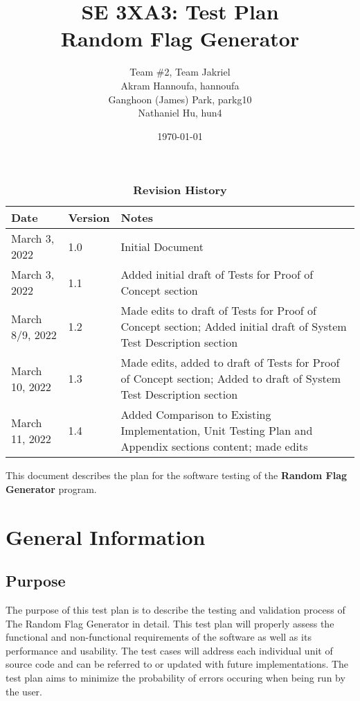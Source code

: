 \documentclass[12pt, titlepage]{article}
\title{SE 3XA3: Test Plan\\Random Flag Generator}
\author{Team \#2, Team Jakriel
		\\ Akram Hannoufa, hannoufa
		\\ Ganghoon (James) Park, parkg10
		\\ Nathaniel Hu, hun4
}
\date{\today}
\begin{document}
\maketitle

\tableofcontents
\listoftables

\newpage
\begin{table}[h]
\caption{\bf Revision History}
\begin{tabularx}{\textwidth}{p{3cm}p{2cm}X}
\toprule {\bf Date} & {\bf Version} & {\bf Notes}\\
\midrule
March 3, 2022 & 1.0 & Initial Document\\
March 3, 2022 & 1.1 & Added initial draft of Tests for Proof of Concept section\\
March 8/9, 2022 & 1.2 & Made edits to draft of Tests for Proof of Concept section; Added initial draft of System Test Description section\\
March 10, 2022 & 1.3 & Made edits, added to draft of Tests for Proof of
Concept section; Added to draft of System Test Description section\\
March 11, 2022 & 1.4 & Added Comparison to Existing Implementation, Unit Testing Plan and Appendix sections content; made edits\\
\bottomrule
\end{tabularx}
\end{table}

\newpage


\noindent This document describes the plan for the software testing of the \textbf{Random Flag Generator} program.

\section{General Information}

\subsection{Purpose}
The purpose of this test plan is to describe the testing and validation
process of The Random Flag Generator in detail. This test plan will properly
assess the functional and non-functional requirements of the software as well
as its performance and usability. The test cases will address each individual
unit of source code and can be referred to or updated with future
implementations. The test plan aims to minimize the probability of errors
occuring when being run by the user.
\end{document}

